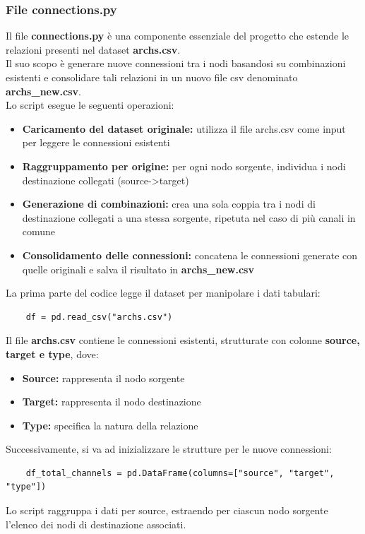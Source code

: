 \documentclass[12pt]{article}
\begin{document}
	\subsubsection{File connections.py}
	Il file \textbf{connections.py} è una componente essenziale del progetto che estende le relazioni presenti nel dataset \textbf{archs.csv}.\\
	Il suo scopo è generare nuove connessioni tra i nodi basandosi su combinazioni esistenti e consolidare tali relazioni in un nuovo file csv denominato \textbf{archs\_new.csv}.\\
	Lo script esegue le seguenti operazioni:
	\begin{itemize}[label=]
		\item \textbf{Caricamento del dataset originale:} utilizza il file archs.csv come input per leggere le connessioni esistenti
		\item \textbf{Raggruppamento per origine:} per ogni nodo sorgente, individua i nodi destinazione collegati (source->target)
		\item \textbf{Generazione di combinazioni:} crea una sola coppia tra i nodi di destinazione collegati a una stessa sorgente, ripetuta nel caso di più canali in comune
		\item \textbf{Consolidamento delle connessioni:} concatena le connessioni generate con quelle originali e salva il risultato in \textbf{archs\_new.csv}
	\end{itemize}
	La prima parte del codice legge il dataset per manipolare i dati tabulari:
	\begin{lstlisting}
	df = pd.read_csv("archs.csv")
	\end{lstlisting}
	Il file \textbf{archs.csv} contiene le connessioni esistenti, strutturate con colonne \textbf{source, target e type}, dove:
	\begin{itemize}[label=]
		\item \textbf{Source:} rappresenta il nodo sorgente
		\item \textbf{Target:} rappresenta il nodo destinazione
		\item \textbf{Type:} specifica la natura della relazione
	\end{itemize}
	Successivamente, si va ad inizializzare le strutture per le nuove connessioni:
	\begin{lstlisting}	
	df_total_channels = pd.DataFrame(columns=["source", "target", "type"])
	\end{lstlisting}
	Lo script raggruppa i dati per source, estraendo per ciascun nodo sorgente l'elenco dei nodi di destinazione associati.\\
\end{document}
